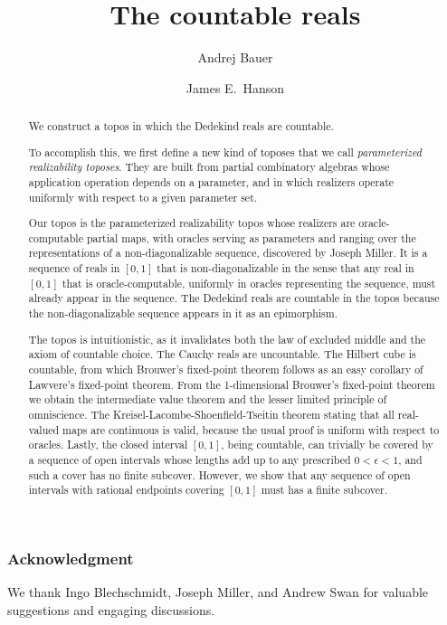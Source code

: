 \documentclass[11pt]{amsart}
\title{The countable reals}
\author{Andrej Bauer}
\author{James E.~Hanson}
\numberwithin{equation}{section}
\begin{document}
\begin{abstract}
  We construct a topos in which the Dedekind reals are countable.

  To accomplish this, we first define a new kind of toposes that we call \emph{parameterized realizability toposes}. They are built from partial combinatory algebras whose application operation depends on a parameter, and in which realizers operate uniformly with respect to a given parameter set.

  Our topos is the parameterized realizability topos whose realizers are oracle-computable partial maps, with oracles serving as parameters and ranging over the representations of a non-diagonalizable sequence, discovered by Joseph Miller. It is a sequence of reals in $[0,1]$ that is non-diagonalizable in the sense that any real in $[0,1]$ that is oracle-computable, uniformly in oracles representing the sequence, must already appear in the sequence.
  The Dedekind reals are countable in the topos because the non-diagonalizable sequence appears in it as an epimorphism.

  The topos is intuitionistic, as it invalidates both the law of excluded middle and the axiom of countable choice. The Cauchy reals are uncountable. The Hilbert cube is countable, from which Brouwer's fixed-point theorem follows as an easy corollary of Lawvere's fixed-point theorem. From the 1-dimensional Brouwer's fixed-point theorem we obtain the intermediate value theorem and the lesser limited principle of omniscience. The Kreisel-Lacombe-Shoenfield-Tseitin theorem stating that all real-valued maps are continuous is valid, because the usual proof is uniform with respect to oracles.
  Lastly, the closed interval $[0,1]$, being countable, can trivially be covered by a sequence of open intervals whose lengths add up to any prescribed $0 < \epsilon < 1$, and such a cover has no finite subcover.
  However, we show that any sequence of open intervals with rational endpoints covering $[0,1]$ must has a finite subcover.
\end{abstract}

\maketitle









\subsubsection*{Acknowledgment}

We thank Ingo Blechschmidt, Joseph Miller, and Andrew Swan for valuable suggestions and engaging discussions.


% 




\appendix
%
\end{document}
